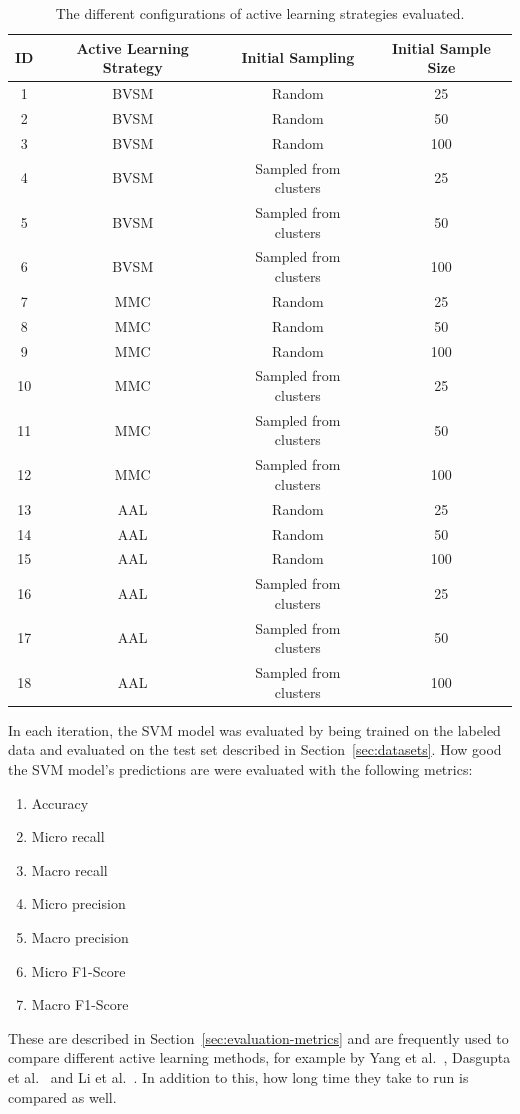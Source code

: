 \begin{table}
    \centering
    \begin{tabular}{|cccc|}
        \hline
        \textbf{ID} & \textbf{Active Learning Strategy} & \textbf{Initial Sampling} & \textbf{Initial Sample Size}\\
        \hline
        1 & BVSM & Random & 25\\
        2 & BVSM & Random & 50\\
        3 & BVSM & Random & 100\\
        4 & BVSM & Sampled from clusters & 25\\
        5 & BVSM & Sampled from clusters & 50\\
        6 & BVSM & Sampled from clusters & 100\\
        7 & MMC & Random & 25\\
        8 & MMC & Random & 50\\
        9 & MMC & Random & 100\\
        10 & MMC & Sampled from clusters & 25\\
        11 & MMC & Sampled from clusters & 50\\
        12 & MMC & Sampled from clusters & 100\\
        13 & AAL & Random & 25\\
        14 & AAL & Random & 50\\
        15 & AAL & Random & 100\\
        16 & AAL & Sampled from clusters & 25\\
        17 & AAL & Sampled from clusters & 50\\
        18 & AAL & Sampled from clusters & 100\\
        \hline
    \end{tabular}
    \caption{The different configurations of active learning strategies evaluated.}
    \label{fig:active-learning-configurations}
\end{table}


In each iteration, the SVM model was evaluated by being trained on the labeled data and evaluated on the test set described in Section~\ref{sec:datasets}.
How good the SVM model's predictions are were evaluated with the following metrics:
\begin{enumerate}
    \item Accuracy
    \item Micro recall
    \item Macro recall
    \item Micro precision
    \item Macro precision
    \item Micro F1-Score
    \item Macro F1-Score
\end{enumerate}
These are described in Section~\ref{sec:evaluation-metrics} and are frequently used to compare different active learning methods, for example by Yang et al\@.~\cite{yang2009effective}, Dasgupta et al\@.~\cite{dasgupta2008hierarchical} and Li et al\@.~\cite{li2013active}.
In addition to this, how long time they take to run is compared as well.

